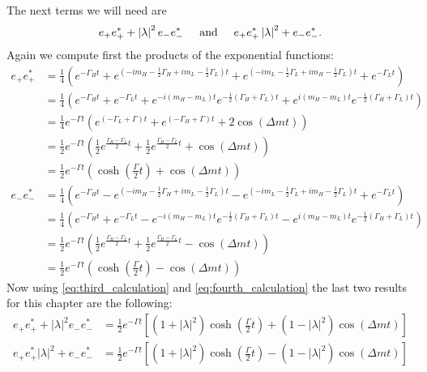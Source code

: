 The next terms we will need are
\begin{equation}
  e_{+}e_{+}^*+\left|\lambda\right|^2e_-e_-^* \hspace{0.5cm} \text{and} \hspace{0.5cm} e_{+}e_{+}^*\left|\lambda\right|^2+e_-e_-^*.
\end{equation}
Again we compute first the products of the exponential functions:
\begin{align}
  e_+e_+^* &= \frac{1}{4}\left(e^{-\Gamma_Ht}+e^{\left(-im_H-\frac{1}{2}\Gamma_H+im_L-\frac{1}{2}\Gamma_L\right)t}
  +e^{\left(-im_L-\frac{1}{2}\Gamma_L+im_H-\frac{1}{2}\Gamma_L\right)t}+e^{-\Gamma_Lt}\right)\nonumber\\
  &= \frac{1}{4}\left(e^{-\Gamma_Ht}+e^{-\Gamma_Lt}+e^{-i\left(m_H-m_L\right)t}e^{-\frac{1}{2}\left(\Gamma_H+\Gamma_L\right)t}
  +e^{i\left(m_H-m_L\right)t}e^{-\frac{1}{2}\left(\Gamma_H+\Gamma_L\right)t}\right)\nonumber\\
  &=\frac{1}{4}e^{-\Gamma t}\left(e^{\left(-\Gamma_L+\Gamma\right)t}+e^{\left(-\Gamma_H+\Gamma\right)t}+2\cos\left(\Delta mt\right)\right)\nonumber\\
  &=\frac{1}{2}e^{-\Gamma t}\left(\frac{1}{2}e^{\frac{\Gamma_H-\Gamma_L}{2}t}+\frac{1}{2}e^{\frac{\Gamma_H-\Gamma_L}{2}t}+\cos\left(\Delta mt\right)\right)\nonumber\\
  &=\frac{1}{2}e^{-\Gamma t}\left(\cosh\left(\frac{\Gamma}{2}t\right)+\cos\left(\Delta mt\right)\right)\label{eq:third_calculation}\\
  e_-e_-^* &= \frac{1}{4}\left(e^{-\Gamma_Ht}-e^{\left(-im_H-\frac{1}{2}\Gamma_H+im_L-\frac{1}{2}\Gamma_L\right)t}
  -e^{\left(-im_L-\frac{1}{2}\Gamma_L+im_H-\frac{1}{2}\Gamma_L\right)t}+e^{-\Gamma_Lt}\right)\nonumber\\
  &= \frac{1}{4}\left(e^{-\Gamma_Ht}+e^{-\Gamma_Lt}-e^{-i\left(m_H-m_L\right)t}e^{-\frac{1}{2}\left(\Gamma_H+\Gamma_L\right)t}
  -e^{i\left(m_H-m_L\right)t}e^{-\frac{1}{2}\left(\Gamma_H+\Gamma_L\right)t}\right)\nonumber\\
  &= \frac{1}{2}e^{-\Gamma t}\left(\frac{1}{2}e^{\frac{\Gamma_H-\Gamma_L}{2}t}+\frac{1}{2}e^{\frac{\Gamma_H-\Gamma_L}{2}t}-\cos\left(\Delta mt\right)\right)\nonumber\\
  &= \frac{1}{2}e^{-\Gamma t}\left(\cosh\left(\frac{\Gamma}{2}t\right)-\cos\left(\Delta mt\right)\right)\label{eq:fourth_calculation}
\end{align}
Now using \cref{eq:third_calculation} and \cref{eq:fourth_calculation} the last two results for this chapter are the following:
\begin{align}
  e_+e_+^* + \left|\lambda\right|^2 e_-e_-^* &= \frac{1}{2}e^{-\Gamma t}\left[\left(1+\left|\lambda\right|^2\right)\cosh\left(\frac{\Gamma}{2}t\right)
  +\left(1-\left|\lambda\right|^2\right)\cos\left(\Delta mt\right)\right]\label{eq:result_3}\\
  e_+e_+^* \left|\lambda\right|^2 + e_-e_-^* &= \frac{1}{2}e^{-\Gamma t}\left[\left(1+\left|\lambda\right|^2\right)\cosh\left(\frac{\Gamma}{2}t\right)
  -\left(1-\left|\lambda\right|^2\right)\cos\left(\Delta mt\right)\right]\label{eq:result_4}
\end{align}
